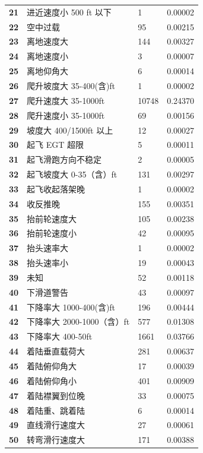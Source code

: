 \documentclass[UTF8]{ctexart}
\begin{document}
\begin{table}[!ht]
{\begin{tabular}{|l|lll|}
		\textbf{21} & 进近速度小 500 ft 以下  & 1 & 0.00002 \\ 
		\textbf{22} & 空中过载  & 95 & 0.00215 \\ 
		\textbf{23} & 离地速度大  & 144 & 0.00327 \\ 
		\textbf{24} & 离地速度小  & 3 & 0.00007 \\ 
		\textbf{25} & 离地仰角大  & 6 & 0.00014 \\ 
		\textbf{26} & 爬升坡度大 35-400(含)ft  & 1 & 0.00002 \\ 
		\textbf{27} & 爬升速度大 35-1000ft  & 10748 & 0.24370 \\ 
		\textbf{28} & 爬升速度小 35-1000ft  & 69 & 0.00156 \\ 
		\textbf{29} & 坡度大 400/1500ft 以上  & 12 & 0.00027 \\ 
		\textbf{30} & 起飞 EGT 超限  & 5 & 0.00011 \\ 
		\textbf{31} & 起飞滑跑方向不稳定  & 2 & 0.00005 \\ 
		\textbf{32} & 起飞坡度大 0-35（含）ft  & 131 & 0.00297 \\ 
		\textbf{33} & 起飞收起落架晚  & 1 & 0.00002 \\ 
		\textbf{34} & 收反推晚  & 155 & 0.00351 \\ 
		\textbf{35} & 抬前轮速度大  & 105 & 0.00238 \\ 
		\textbf{36} & 抬前轮速度小  & 42 & 0.00095 \\ 
		\textbf{37} & 抬头速率大  & 1 & 0.00002 \\ 
		\textbf{38} & 抬头速率小  & 19 & 0.00043 \\ 
		\textbf{39} & 未知  & 52 & 0.00118 \\ 
		\textbf{40} & 下滑道警告  & 43 & 0.00097 \\ 
		\textbf{41} & 下降率大 1000-400(含)ft  & 196 & 0.00444 \\ 
		\textbf{42} & 下降率大 2000-1000（含）ft  & 577 & 0.01308 \\ 
		\textbf{43} & 下降率大 400-50ft  & 1661 & 0.03766 \\ 
		\textbf{44} & 着陆垂直载荷大  & 281 & 0.00637 \\ 
		\textbf{45} & 着陆俯仰角大  & 17 & 0.00039 \\ 
		\textbf{46} & 着陆俯仰角小  & 401 & 0.00909 \\ 
		\textbf{47} & 着陆襟翼到位晚  & 33 & 0.00075 \\ 
		\textbf{48} & 着陆重、跳着陆  & 6 & 0.00014 \\ 
		\textbf{49} & 直线滑行速度大  & 27 & 0.00061 \\ 
		\textbf{50} & 转弯滑行速度大  & 171 & 0.00388 \\ \hline
	\end{tabular}
}
\end{table}\par
\end{document}
